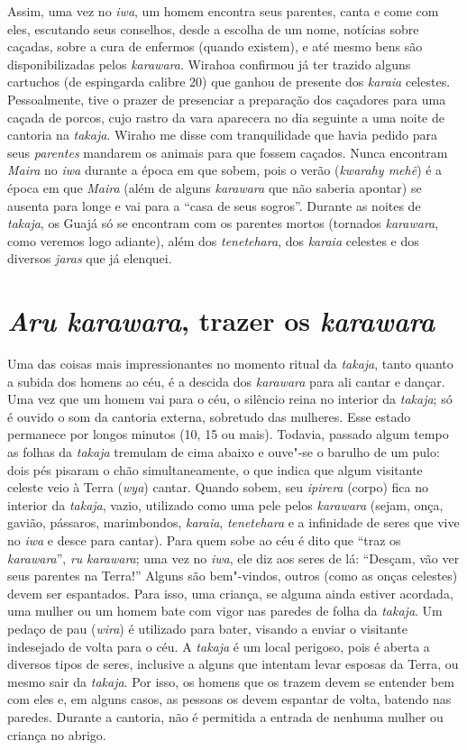 Assim, uma vez no \emph{iwa}, um homem encontra seus parentes, canta e
come com eles, escutando seus conselhos, desde a escolha de um nome,
notícias sobre caçadas, sobre a cura de enfermos (quando existem), e até
mesmo bens são disponibilizadas pelos \emph{karawara}. Wirahoa confirmou
já ter trazido alguns cartuchos (de espingarda calibre 20) que ganhou de
presente dos \emph{karaia} celestes. Pessoalmente, tive o prazer de
presenciar a preparação dos caçadores para uma caçada de porcos, cujo
rastro da vara aparecera no dia seguinte a uma noite de cantoria na
\emph{takaja}. Wiraho me disse com tranquilidade que havia pedido para
seus \emph{parentes} mandarem os animais para que fossem caçados. Nunca
encontram \emph{Maira} no \emph{iwa} durante a época em que sobem, pois
o verão (\emph{kwarahy mehẽ}) é a época em que \emph{Maira} (além de
alguns \emph{karawara} que não saberia apontar) se ausenta para longe e
vai para a ``casa de seus sogros''. Durante as noites de \emph{takaja},
os Guajá só se encontram com os parentes mortos (tornados
\emph{karawara}, como veremos logo adiante), além dos \emph{tenetehara},
dos \emph{karaia} celestes e dos diversos \emph{jaras} que já elenquei.

\section{\emph{Aru karawara}, trazer os \emph{karawara}}\label{aru-karawara-trazer-os-karawara}

Uma das coisas mais impressionantes no momento ritual da \emph{takaja},
tanto quanto a subida dos homens ao céu, é a descida dos \emph{karawara}
para ali cantar e dançar. Uma vez que um homem vai para o céu, o
silêncio reina no interior da \emph{takaja}; só é ouvido o som da
cantoria externa, sobretudo das mulheres. Esse estado permanece por
longos minutos (10, 15 ou mais). Todavia, passado algum tempo as folhas
da \emph{takaja} tremulam de cima abaixo e ouve"-se o barulho de um pulo:
dois pés pisaram o chão simultaneamente, o que indica que algum
visitante celeste veio à Terra (\emph{wya}) cantar. Quando sobem, seu
\emph{ipirera} (corpo) fica no interior da \emph{takaja}, vazio,
utilizado como uma pele pelos \emph{karawara} (sejam, onça, gavião,
pássaros, marimbondos, \emph{karaia}, \emph{tenetehara} e a infinidade
de seres que vive no \emph{iwa} e desce para cantar). Para quem sobe ao
céu é dito que ``traz os \emph{karawara}'', \emph{ru} \emph{karawara}; uma
vez no \emph{iwa}, ele diz aos seres de lá: ``Desçam, vão ver seus
parentes na Terra!'' Alguns são bem"-vindos, outros (como as onças
celestes) devem ser espantados. Para isso, uma criança, se alguma ainda
estiver acordada, uma mulher ou um homem bate com vigor nas paredes de
folha da \emph{takaja}. Um pedaço de pau (\emph{wira}) é utilizado para
bater, visando a enviar o visitante indesejado de volta para o céu. A
\emph{takaja} é um local perigoso, pois é aberta a diversos tipos de
seres, inclusive a alguns que intentam levar esposas da Terra, ou mesmo
sair da \emph{takaja}. Por isso, os homens que os trazem devem se
entender bem com eles e, em alguns casos, as pessoas os devem espantar
de volta, batendo nas paredes. Durante a cantoria, não é permitida a
entrada de nenhuma mulher ou criança no abrigo.

